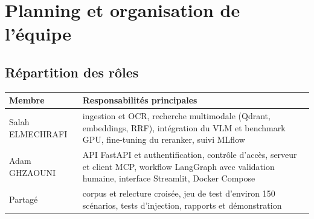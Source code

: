 \documentclass[11pt,a4paper]{article}
\begin{document}
\section{Planning et organisation de l'équipe}\label{sec:planning}
\subsection{Répartition des rôles}
\begin{center}
\begin{tabularx}{\linewidth}{L{3cm}X}
\toprule
\textbf{Membre} & \textbf{Responsabilités principales}\\\midrule
Salah ELMECHRAFI & ingestion et OCR, recherche multimodale (Qdrant, embeddings, RRF), intégration du VLM et benchmark GPU, fine-tuning du reranker, suivi MLflow\\
Adam GHZAOUNI & API FastAPI et authentification, contrôle d'accès, serveur et client MCP, workflow LangGraph avec validation humaine, interface Streamlit, Docker Compose\\
Partagé & corpus et relecture croisée, jeu de test d'environ 150 scénarios, tests d'injection, rapports et démonstration\\
\bottomrule
\end{tabularx}
\end{center}

\newpage
\end{document}
